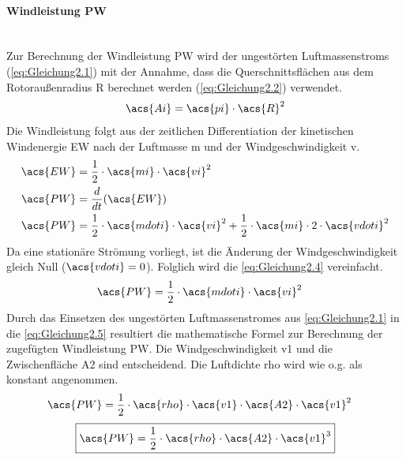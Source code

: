\paragraph{Windleistung \acs{PW}}\mbox{}\smallskip\\
Zur Berechnung der Windleistung \acs{PW} wird der ungestörten Luftmassenstroms (\autoref{eq:Gleichung2.1}) mit der Annahme, dass die Querschnittsflächen aus dem Rotoraußenradius \acs{R} berechnet werden (\autoref{eq:Gleichung2.2}) verwendet.
\begin{align}
    \acs{Ai} = \acs{pi}\cdot \acs{R}^2
    \label{eq:Gleichung2.2}
\end{align}
\newline
Die Windleistung folgt aus der zeitlichen Differentiation der kinetischen Windenergie \acs{EW} nach der Luftmasse \acs{m} und der Windgeschwindigkeit \acs{v}. 
\begin{align}
    \acs{EW} &= \frac{1}{2} \cdot \acs{mi} \cdot \acs{vi}^2 \nonumber \\
    \acs{PW} &= \frac{d}{dt}(\acs{EW}) \label{eq:Gleichung2.3} \\
    \acs{PW} &= \frac{1}{2} \cdot \acs{mdoti} \cdot \acs{vi}^2 + \frac{1}{2} \cdot \acs{mi} \cdot 2 \cdot \acs{vdoti}^2 \label{eq:Gleichung2.4}
\end{align}
\newline
Da eine stationäre Strömung vorliegt, ist die Änderung der Windgeschwindigkeit gleich Null ($\acs{vdoti} = 0$). Folglich wird die \autoref{eq:Gleichung2.4} vereinfacht.
\begin{align}
    \acs{PW} &= \frac{1}{2} \cdot \acs{mdoti} \cdot \acs{vi}^2 \label{eq:Gleichung2.5}
\end{align}
\newline
Durch das Einsetzen des ungestörten Luftmassenstromes aus \autoref{eq:Gleichung2.1} in die \autoref{eq:Gleichung2.5} resultiert die mathematische Formel zur Berechnung der zugefügten Windleistung \acs{PW}. Die Windgeschwindigkeit \acs{v1} und die Zwischenfläche \acs{A2} sind entscheidend. Die Luftdichte \acs{rho} wird wie o.g. als konstant angenommen.
\begin{align*}
    \acs{PW} &= \frac{1}{2} \cdot \acs{rho} \cdot \acs{v1} \cdot \acs{A2} \cdot \acs{v1}^2
\end{align*}
\begin{equation}\label{eq:Gleichung2.6}
    \boxed{\acs{PW} = \frac{1}{2} \cdot \acs{rho} \cdot \acs{A2} \cdot \acs{v1}^3} 
\end{equation}

